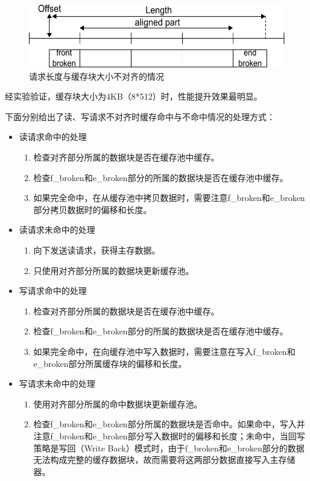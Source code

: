 \begin{figure}[H]
\centering
\includegraphics[width=0.8\linewidth]{./graph/vsize-cache-block}
\caption{请求长度与缓存块大小不对齐的情况}
\label{fig:vsize-cache-block}
\end{figure}

经实验验证，缓存块大小为4KB（8*512）时，性能提升效果最明显。

下面分别给出了读、写请求不对齐时缓存命中与不命中情况的处理方式：

\begin{itemize}

\item 读请求命中的处理
\begin{enumerate}
\item 检查对齐部分所属的数据块是否在缓存池中缓存。
\item 检查f\_broken和e\_broken部分的所属的数据块是否在缓存池中缓存。
\item 如果完全命中，在从缓存池中拷贝数据时，需要注意f\_broken和e\_broken部分拷贝数据时的偏移和长度。
\end{enumerate}

\item 读请求未命中的处理
\begin{enumerate}
\item 向下发送读请求，获得主存数据。
\item 只使用对齐部分所属的数据块更新缓存池。
\end{enumerate}

\item 写请求命中的处理
\begin{enumerate}
\item 检查对齐部分所属的数据块是否在缓存池中缓存。
\item 检查f\_broken和e\_broken部分的所属的数据块是否在缓存池中缓存。
\item 如果完全命中，在向缓存池中写入数据时，需要注意在写入f\_broken和e\_broken部分所属缓存块的偏移和长度。
\end{enumerate}

\item 写请求未命中的处理
\begin{enumerate}
\item 使用对齐部分所属的命中数据块更新缓存池。
\item 检查f\_broken和e\_broken部分所属的数据块是否命中。如果命中，写入并注意f\_broken和e\_broken部分写入数据时的偏移和长度；未命中，当回写策略是写回（Write Back）模式时，由于f\_broken和e\_broken部分的数据无法构成完整的缓存数据块，故而需要将这两部分数据直接写入主存储器。
\end{enumerate}

\end{itemize}

